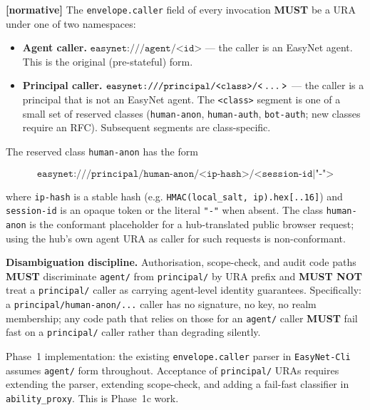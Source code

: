 \documentclass[11pt,a4paper]{article}
\newcommand{\normsv}{\textcolor{normativecolor}{\textbf{[normative]}}\xspace}
\theoremstyle{definition}
\begin{document}
\normsv{}
The \texttt{envelope.caller} field of every invocation \textbf{MUST}
be a URA under one of two namespaces:

\begin{itemize}[leftmargin=2em,itemsep=0.3em]
    \item \textbf{Agent caller.}
    $\texttt{easynet:///agent/<id>}$ --- the caller is an EasyNet
    agent. This is the original (pre-stateful) form.

    \item \textbf{Principal caller.}
    $\texttt{easynet:///principal/<class>/<\,\ldots\,>}$ --- the
    caller is a principal that is not an EasyNet agent. The
    \texttt{<class>} segment is one of a small set of reserved
    classes (\texttt{human-anon}, \texttt{human-auth},
    \texttt{bot-auth}; new classes require an RFC). Subsequent
    segments are class-specific.
\end{itemize}

The reserved class \texttt{human-anon} has the form

\[
    \texttt{easynet:///principal/human-anon/<ip-hash>/<session-id|"-">}
\]

where \texttt{ip-hash} is a stable hash (e.g.
\texttt{HMAC(local\_salt, ip).hex[..16]}) and \texttt{session-id}
is an opaque token or the literal \texttt{"-"} when absent. The
class \texttt{human-anon} is the conformant placeholder for a
hub-translated public browser request; using the hub's own agent
URA as caller for such requests is non-conformant.

\textbf{Disambiguation discipline.} Authorisation, scope-check, and
audit code paths \textbf{MUST} discriminate \texttt{agent/} from
\texttt{principal/} by URA prefix and \textbf{MUST NOT} treat a
\texttt{principal/} caller as carrying agent-level identity
guarantees. Specifically: a \texttt{principal/human-anon/...} caller
has no signature, no key, no realm membership; any code path that
relies on those for an \texttt{agent/} caller \textbf{MUST} fail
fast on a \texttt{principal/} caller rather than degrading
silently.

\begin{warningbox}
Phase~1 implementation: the existing \texttt{envelope.caller} parser
in \texttt{EasyNet-Cli} assumes \texttt{agent/} form throughout.
Acceptance of \texttt{principal/} URAs requires extending the parser,
extending scope-check, and adding a fail-fast classifier in
\texttt{ability\_proxy}. This is Phase~1c work.
\end{warningbox}
\end{document}
